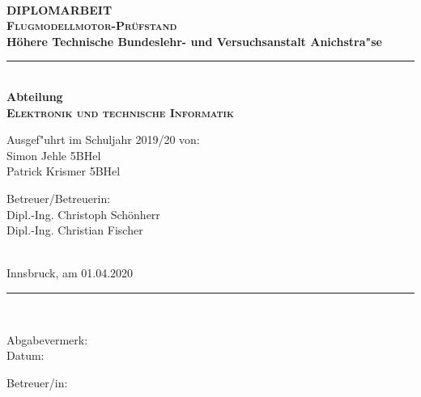 \documentclass[12pt,a4paper]{article}
\begin{document}
\addtocounter{page}{0}
%
%
 \begin{center}
   \begin{minipage}{\linewidth}
   \begin{center}
	\vspace*{-14mm}
	\noindent%
	\\[35mm]{\fontsize{25pt}{25pt}\selectfont\bf DIPLOMARBEIT}
	\\[19mm]{\fontsize{20pt}{20pt}\selectfont\textbf{\textsc{Flugmodellmotor-Prüfstand}}}
	\\[15mm]{\fontsize{12.4pt}{12.4pt}\selectfont\bf
		Höhere Technische Bundeslehr- und Versuchsanstalt Anichstra"se}
	\\[ 5mm]\rule{132mm}{1.0pt}
	\\[ 4mm]{\fontsize{12.4pt}{12.4pt}\selectfont\bf Abteilung}
	\\[ 5mm]{\fontsize{16pt}{16pt}\selectfont
		\textbf{\textsc{Elektronik und technische Informatik}}}
	\\[24mm]{\hspace*{2mm}\parbox{154mm}{\fontsize{12.4pt}{12.4pt}\selectfont
	  \parbox[t]{75mm}{
		Ausgef"uhrt im Schuljahr 2019/20 von:
		\\[5.0mm]Simon Jehle 5BHel
		\\[2.5mm]Patrick Krismer 5BHel
	  }
	  \hspace*{6mm}
	  \parbox[t]{55mm}{
		Betreuer/Betreuerin:
		\\[5.0mm]Dipl.-Ing. Christoph Schönherr
		\\[5.0mm]Dipl.-Ing. Christian Fischer
		
	  }
	  \\[14mm]{Innsbruck, am 01.04.2020}
	  \\[16mm]\rule{150mm}{0.5pt}
	  \\[ 8mm]
	  \parbox[t]{75mm}{
		Abgabevermerk:
		\\[3.25mm]Datum:
	  }
	  \hspace*{6mm}
	  \parbox[t]{50mm}{
		Betreuer/in:
	  }
	}}
   \end{center}\hfill
   \end{minipage}
 \end{center}
%
%
\newpage
\end{document}
